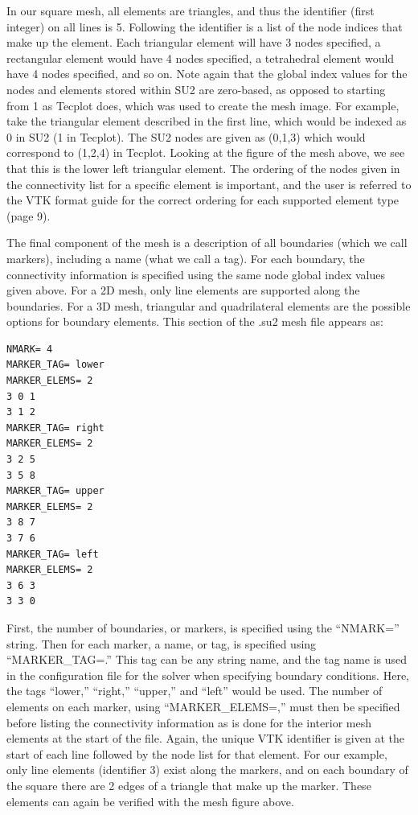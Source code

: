 \documentclass[12pt, a4paper, twoside]{article}
\begin{document}
In our square mesh, all elements are triangles, and thus the identifier (first integer) on all lines is 5. Following the identifier is a list of the node indices that make up the element. Each triangular element will have 3 nodes specified, a rectangular element would have 4 nodes specified, a tetrahedral element would have 4 nodes specified, and so on. Note again that the global index values for the nodes and elements stored within SU2 are zero-based, as opposed to starting from 1 as Tecplot does, which was used to create the mesh image. For example, take the triangular element described in the first line, which would be indexed as 0 in SU2 (1 in Tecplot). The SU2 nodes are given as (0,1,3) which would correspond to (1,2,4) in Tecplot. Looking at the figure of the mesh above, we see that this is the lower left triangular element. The ordering of the nodes given in the connectivity list for a specific element is important, and the user is referred to the VTK format guide for the correct ordering for each supported element type (page 9).

The final component of the mesh is a description of all boundaries (which we call markers), including a name (what we call a tag). For each boundary, the connectivity information is specified using the same node global index values given above. For a 2D mesh, only line elements are supported along the boundaries. For a 3D mesh, triangular and quadrilateral elements are the possible options for boundary elements. This section of the .su2 mesh file appears as:

\begin{lstlisting}
NMARK= 4
MARKER_TAG= lower
MARKER_ELEMS= 2
3 0 1
3 1 2
MARKER_TAG= right
MARKER_ELEMS= 2
3 2 5
3 5 8
MARKER_TAG= upper
MARKER_ELEMS= 2
3 8 7
3 7 6
MARKER_TAG= left
MARKER_ELEMS= 2
3 6 3
3 3 0
\end{lstlisting}


First, the number of boundaries, or markers, is specified using the “NMARK=” string. Then for each marker, a name, or tag, is specified using “MARKER\_TAG=.” This tag can be any string name, and the tag name is used in the configuration file for the solver when specifying boundary conditions. Here, the tags “lower,” “right,” “upper,” and “left” would be used. The number of elements on each marker, using “MARKER\_ELEMS=,” must then be specified before listing the connectivity information as is done for the interior mesh elements at the start of the file. Again, the unique VTK identifier is given at the start of each line followed by the node list for that element. For our example, only line elements (identifier 3) exist along the markers, and on each boundary of the square there are 2 edges of a triangle that make up the marker. These elements can again be verified with the mesh figure above.
\end{document}
